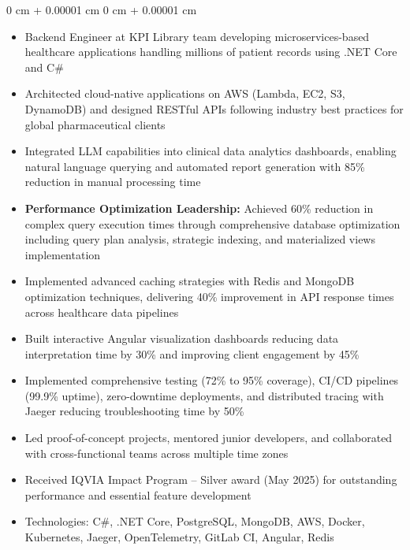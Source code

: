 \documentclass[10pt, letterpaper]{article}
\newenvironment{highlights}{
    \begin{itemize}[
        topsep=0.10 cm,
        parsep=0.10 cm,
        partopsep=0pt,
        itemsep=0pt,
        leftmargin=0 cm + 10pt
    ]
}{
    \end{itemize}
} %
\newenvironment{onecolentry}{
    \begin{adjustwidth}{
        0 cm + 0.00001 cm
    }{
        0 cm + 0.00001 cm
    }
}{
    \end{adjustwidth}
} %
\begin{document}
        \vspace{0.10 cm}
        \begin{onecolentry}
            \begin{highlights}
                \item Backend Engineer at KPI Library team developing microservices-based healthcare applications handling millions of patient records using .NET Core and C\#
                \item Architected cloud-native applications on AWS (Lambda, EC2, S3, DynamoDB) and designed RESTful APIs following industry best practices for global pharmaceutical clients
                \item Integrated LLM capabilities into clinical data analytics dashboards, enabling natural language querying and automated report generation with 85\% reduction in manual processing time
                \item \textbf{Performance Optimization Leadership:} Achieved 60\% reduction in complex query execution times through comprehensive database optimization including query plan analysis, strategic indexing, and materialized views implementation
                \item Implemented advanced caching strategies with Redis and MongoDB optimization techniques, delivering 40\% improvement in API response times across healthcare data pipelines
                \item Built interactive Angular visualization dashboards reducing data interpretation time by 30\% and improving client engagement by 45\%
                \item Implemented comprehensive testing (72\% to 95\% coverage), CI/CD pipelines (99.9\% uptime), zero-downtime deployments, and distributed tracing with Jaeger reducing troubleshooting time by 50\%
                \item Led proof-of-concept projects, mentored junior developers, and collaborated with cross-functional teams across multiple time zones
                \item Received IQVIA Impact Program – Silver award (May 2025) for outstanding performance and essential feature development
                \item Technologies: C\#, .NET Core, PostgreSQL, MongoDB, AWS, Docker, Kubernetes, Jaeger, OpenTelemetry, GitLab CI, Angular, Redis
            \end{highlights}
        \end{onecolentry}
\end{document}
